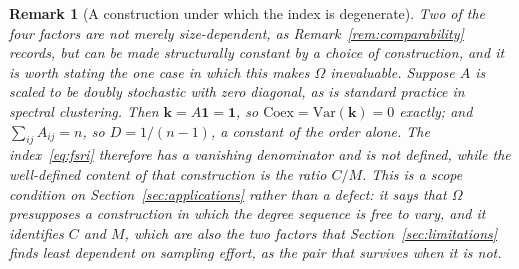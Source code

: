 \documentclass[11pt,a4paper]{article}
\newtheorem{remark}{Remark}
\begin{document}
\begin{remark}[A construction under which the index is degenerate]
\label{rem:doubly_stochastic}
Two of the four factors are not merely size-dependent, as
Remark~\ref{rem:comparability} records, but can be made structurally
constant by a choice of construction, and it is worth stating the one case in
which this makes $\Omega$ inevaluable. Suppose $A$ is scaled to be doubly
stochastic with zero diagonal, as is standard practice in spectral
clustering. Then $\mathbf{k} = A\mathbf{1} = \mathbf{1}$, so
$\mathrm{Coex} = \mathrm{Var}(\mathbf{k}) = 0$ exactly; and
$\sum_{ij} A_{ij} = n$, so $D = 1/(n-1)$, a constant of the order alone.
The index~\eqref{eq:fsri} therefore has a vanishing denominator and is not
defined, while the well-defined content of that construction is the ratio
$C/M$. This is a scope condition on Section~\ref{sec:applications} rather
than a defect: it says that $\Omega$ presupposes a construction in which the
degree sequence is free to vary, and it identifies $C$ and $M$, which are
also the two factors that
Section~\ref{sec:limitations} finds least dependent on sampling effort, as
the pair that survives when it is not.
\end{remark}
\end{document}
